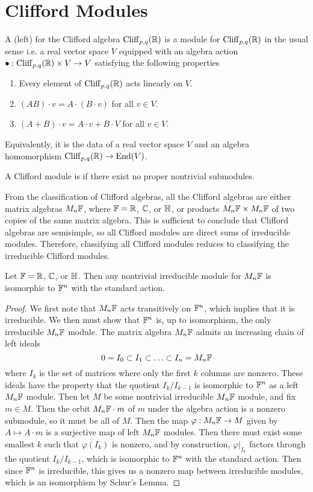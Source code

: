 %
\section{Clifford Modules}
%
\begin{defn}
 A (left)  for the Clifford algebra $\operatorname{Cliff}_{p,q}(\mathbb{R})$ is a module
 for $\operatorname{Cliff}_{p,q}(\mathbb{R})$ in the usual sense i.e. a real vector space $V$ equipped
 with an algebra action $\bullet: \operatorname{Cliff}_{p,q}(\mathbb{R}) \times V \to V$ satisfying
 the following properties
 \begin{enumerate}
  \item Every element of $\operatorname{Cliff}_{p,q}(\mathbb{R})$ acts linearly on $V$.
  \item $(AB) \cdot v = A\cdot(B \cdot v)$ for all $v \in V$.
  \item $(A + B) \cdot v = A\cdot v + B\cdot V$ for all $v \in V$.
 \end{enumerate}
 Equivalently, it is the data of a real vector space $V$ and an algebra homomorphism
 $\operatorname{Cliff}_{p,q}(\mathbb{R}) \to \operatorname{End}(V)$.
\end{defn}
%
\begin{defn}
 A Clifford module is  if there exist no proper nontrivial submodules.
\end{defn}
%
From the classification of Clifford algebras, all the Clifford algebras are either
matrix algebras $M_n\mathbb{F}$, where $\mathbb{F} = \mathbb{R}$, $\mathbb{C}$, or $\mathbb{H}$, or products
$M_n\mathbb{F} \times M_n\mathbb{F}$ of two copies of the same matrix algebra. This is sufficient
to conclude that Clifford algebras are semisimple, so all Clifford modules
are direct sums of irreducible modules. Therefore, classifying all Clifford
modules reduces to classifying the irreducible Clifford modules.
%
\begin{thm}
 Let $\mathbb{F} = \mathbb{R}$, $\mathbb{C}$, or $\mathbb{H}$. Then any nontrivial irreducible module for
 $M_n\mathbb{F}$ is isomorphic to $\mathbb{F}^n$ with the standard action.
\end{thm}
%
\begin{proof}
 We first note that $M_n\mathbb{F}$ acts transitively on $\mathbb{F}^n$, which implies that
 it is irreducible. We then must show that $\mathbb{F}^n$ is, up to isomorphism, the only
 irreducible $M_n\mathbb{F}$ module. The matrix algebra $M_n\mathbb{F}$ admits an increasing
 chain of left ideals
 \[
  0 = I_0 \subset I_1 \subset \ldots \subset I_n = M_n\mathbb{F}
 \]
 where $I_k$ is the set of matrices where only the first $k$ columns are nonzero.
 These ideals have the property that the quotient $I_k / I_{k-1}$ is isomorphic
 to $\mathbb{F}^n$ as a left $M_n\mathbb{F}$ module. Then let $M$ be some nontrivial irreducible
 $M_n\mathbb{F}$ module, and fix $m \in M$. Then the orbit $M_n\mathbb{F} \cdot m$ of $m$
 under the algebra action is a nonzero submodule, so it must be all of $M$.
 Then the map $\varphi : M_n\mathbb{F} \to M$ given by $A \mapsto A \cdot m$ is
 a surjective map of left $M_n\mathbb{F}$ modules. Then there must exist some smallest
 $k$ such that $\varphi(I_k)$ is nonzero, and by construction,
 $\varphi\vert_{I_k}$ factors through the quotient $I_k / I_{k-1}$, which
 is isomorphic to $\mathbb{F}^n$ with the standard action. Then since $\mathbb{F}^n$ is irreducible,
 this gives us a nonzero map between irreducible modules, which is an isomorphism
 by Schur's Lemma.
\end{proof}
